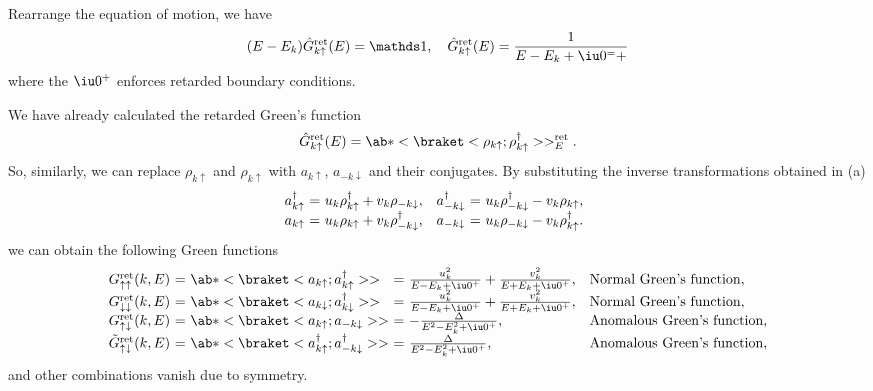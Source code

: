 \begin{solution}
\begin{enumext}
    Rearrange the equation of motion, we have
    \[
      (E - E_k) \hat G_{k\uparrow}^\text{ret}(E) = \identity, \quad
      \hat G_{k\uparrow}^\text{ret}(E) = \frac1{E - E_k + \iu0^=+}
    \]
    where the $\iu0^+$ enforces retarded boundary conditions.
    \item We have already calculated the retarded Green's function
    \[
      \hat G_{k\uparrow}^\text{ret}(E)
    = \ab*<\braket<\rho_{k\uparrow};\rho_{k\uparrow}^\dagger>>_E^\text{ret}.
    \]
    So, similarly, we can replace $\rho_{k\uparrow}$ and $\rho_{k\uparrow}$
    with $a_{k\uparrow}$, $a_{-k\downarrow}$ and their conjugates.
    By substituting the inverse transformations obtained in (a)
    \[
      \begin{array}{l@{~}c@{~}l@{\quad} l@{~}c@{~}l@{\quad}}
        a_{k\uparrow}^\dagger & = &
        u_k \rho_{k\uparrow}^\dagger    + v_k \rho_{-k\downarrow}, &
        a_{-k\downarrow}^\dagger & = &
        u_k \rho_{-k\downarrow}^\dagger - v_k \rho_{k\uparrow},\\
        a_{k\uparrow} & = &
        u_k \rho_{k\uparrow}            + v_k \rho_{-k\downarrow}^\dagger, &
        a_{-k\downarrow} & = &
        u_k \rho_{-k\downarrow}         - v_k \rho_{k\uparrow}^\dagger.
      \end{array}
    \]
    we can obtain the following Green functions
    \[
      \begin{array}{l@{~}c@{~}l@{~}c@{~}l@{\quad}l}
        G_{\uparrow\uparrow}^\text{ret}(k, E)
      & = & \ab*<\braket<a_{k\uparrow}; a_{k\uparrow}^\dagger>>
      & = & \frac{u_k^2}{E - E_k + \iu0^+} + \frac{v_k^2}{E + E_k + \iu0^+},
      & \text{Normal Green's function},\\
        G_{\downarrow\downarrow}^\text{ret}(k, E)
      & = & \ab*<\braket<a_{k\downarrow}; a_{k\downarrow}^\dagger>>
      & = & \frac{u_k^2}{E - E_k + \iu0^+} + \frac{v_k^2}{E + E_k + \iu0^+},
      & \text{Normal Green's function},\\
        G_{\uparrow\downarrow}^\text{ret}(k, E)
      & = & \ab*<\braket<a_{k\uparrow}; a_{-k\downarrow}>>
      & = & -\frac\Delta{E^2 - E_k^2 + \iu0^+},
      & \text{Anomalous Green's function},\\
        \tilde G_{\uparrow\downarrow}^\text{ret}(k, E)
      & = & \ab*<\braket<a_{k\uparrow}^\dagger; a_{-k\downarrow}^\dagger>>
      & = & \frac\Delta{E^2 - E_k^2 + \iu0^+},
      & \text{Anomalous Green's function},
      \end{array}
    \]
    and other combinations vanish due to symmetry.
  \end{enumext}
\end{solution}